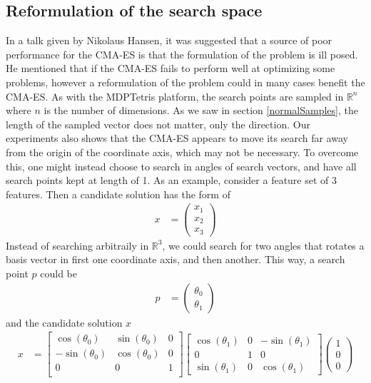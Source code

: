 \subsection{Reformulation of the search space}

In a talk given by Nikolaus Hansen, it was suggested that a source of poor performance 
for the CMA-ES is that the formulation of the problem is ill posed.
He mentioned that if the CMA-ES fails to perform well at optimizing some problems, however a reformulation of the problem could in many cases benefit the CMA-ES. As with the 
MDPTetris platform, the search points are sampled in $\mathbb{R}^n$ where 
$n$ is the number of dimensions. As we saw in section \ref{normalSamples}, the length 
of the sampled vector does not matter, only the direction. Our experiments also shows that 
the CMA-ES appears to move its search far away from the origin of the coordinate axis,
which may not be necessary. To overcome this, one might instead choose to search in angles 
of search vectors, and have all search points kept at length of 1. As an example, 
consider a feature set of 3 features. Then a candidate solution has the form of
\begin{align}
x &= \begin{pmatrix}
x_1 \\
x_2 \\
x_3
\end{pmatrix}
\end{align}
Instead of searching arbitraily in $\mathbb{R}^3$, we could search for two angles that rotates
a basis vector in first one coordinate axis, and then another. This way, a search point $p$ 
could be
\begin{align}
p &= \begin{pmatrix}
\theta_0\\
\theta_1
\end{pmatrix}
\end{align}
and the candidate solution $x$
\begin{align}
x &= 
\begin{bmatrix}
\cos\left( \theta_0 \right) & \sin\left( \theta_0 \right) & 0\\
-\sin\left( \theta_0 \right) & \cos\left( \theta_0 \right) & 0\\
0 & 0 & 1\\
\end{bmatrix}
\begin{bmatrix}
\cos\left( \theta_1 \right) & 0 & -\sin\left( \theta_1 \right)\\
0 & 1 & 0\\
\sin\left( \theta_1 \right) & 0 & \cos\left( \theta_1 \right)
\end{bmatrix}
\begin{pmatrix}
1\\
0\\
0
\end{pmatrix}
\end{align}
